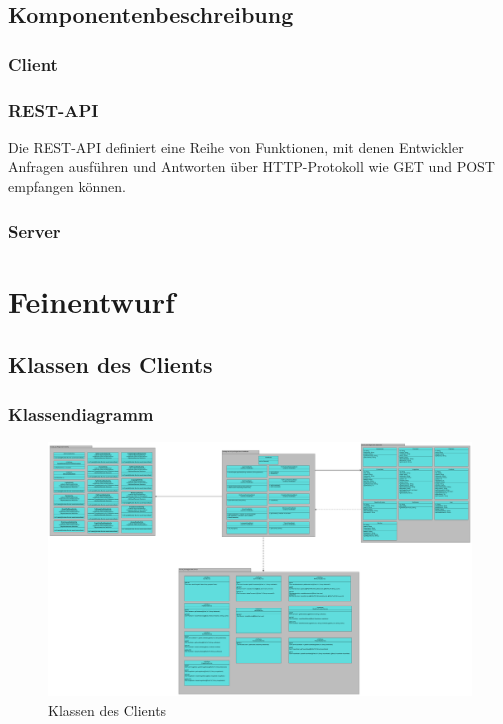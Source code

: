 \documentclass[a4paper]{scrreprt}
\begin{document}
      \newpage
	 
	 \section{Komponentenbeschreibung}
		 \subsection{Client}
	 		
	 		
	 	 \subsection{REST-API}
	 	 	Die REST-API definiert eine Reihe von Funktionen, mit denen Entwickler Anfragen ausführen und Antworten über HTTP-Protokoll wie GET und POST empfangen können.
	 	 	
	  \newpage
		
		 \subsection{Server}
	 	 	
	 	 
        
\newpage

\chapter{Feinentwurf}
	\section{Klassen des Clients}
	\subsection{Klassendiagramm}
	\begin{figure}[H]
	       \centering
	       \includegraphics[scale = .11]{all_client_packages.png}
	       \caption{Klassen des Clients}
	      \end{figure}
	
\end{document}
